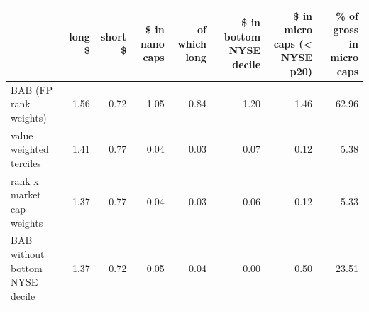 \begin{tabular}{lrrrrrrr}
\toprule
 & long \$ & short \$ & \$ in nano caps &   of which long & \$ in bottom NYSE decile & \$ in micro caps (< NYSE p20) & \% of gross in micro caps \\
\midrule
BAB (FP rank weights) & 1.56 & 0.72 & 1.05 & 0.84 & 1.20 & 1.46 & 62.96 \\
value weighted terciles & 1.41 & 0.77 & 0.04 & 0.03 & 0.07 & 0.12 & 5.38 \\
rank x market cap weights & 1.37 & 0.77 & 0.04 & 0.03 & 0.06 & 0.12 & 5.33 \\
BAB without bottom NYSE decile & 1.37 & 0.72 & 0.05 & 0.04 & 0.00 & 0.50 & 23.51 \\
\bottomrule
\end{tabular}
